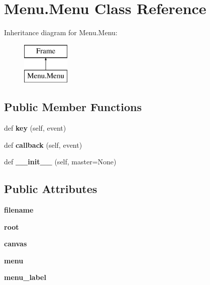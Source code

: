 \hypertarget{class_menu_1_1_menu}{}\section{Menu.\+Menu Class Reference}
\label{class_menu_1_1_menu}
Inheritance diagram for Menu.\+Menu\+:\begin{figure}[H]
\begin{center}
\leavevmode
\includegraphics[height=2.000000cm]{class_menu_1_1_menu}
\end{center}
\end{figure}
\subsection*{Public Member Functions}
\begin{DoxyCompactItemize}
\item 
\mbox{\label{class_menu_1_1_menu_a192785b95591dc7bdc5faf0d2bb56d27}} 
def {\bfseries key} (self, event)
\item 
\mbox{\label{class_menu_1_1_menu_a6dd74d36fda2d88998fba863f029bfe1}} 
def {\bfseries callback} (self, event)
\item 
\mbox{\label{class_menu_1_1_menu_a06cf9e4a3865a0fdbf5a04ea44b6c13b}} 
def {\bfseries \+\_\+\+\_\+init\+\_\+\+\_\+} (self, master=None)
\end{DoxyCompactItemize}
\subsection*{Public Attributes}
\begin{DoxyCompactItemize}
\item 
\mbox{\label{class_menu_1_1_menu_a1e517ddc55633da361d27e455422ffbc}} 
{\bfseries filename}
\item 
\mbox{\label{class_menu_1_1_menu_a4cd78a3815634c8b6702d188c8c0f538}} 
{\bfseries root}
\item 
\mbox{\label{class_menu_1_1_menu_abc5dc4ee892cf12184228f2e138a3d6b}} 
{\bfseries canvas}
\item 
\mbox{\label{class_menu_1_1_menu_abaaf9d372dbc077c24ba14d061bc01f1}} 
{\bfseries menu}
\item 
\mbox{\label{class_menu_1_1_menu_a7e768c5029f17d0fa48bbdac18f524d2}} 
{\bfseries menu\+\_\+label}
\end{DoxyCompactItemize}


